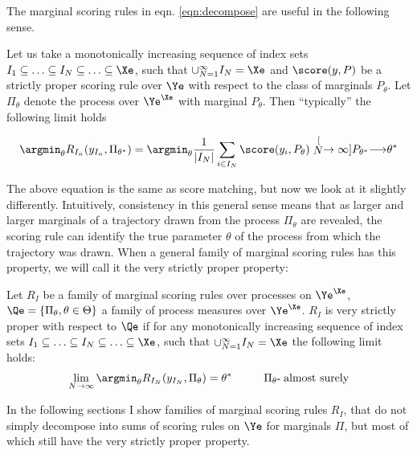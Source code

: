The marginal scoring rules in eqn. \eqref{eqn:decompose} are useful in the following sense.

\begin{statement}
Let us take a monotonically increasing sequence of index sets $I_1\subseteq\ldots\subseteq I_N \subseteq \ldots \subseteq \Xe$, such that $\cup_{N=1}^{\infty} I_N = \Xe$ and $\score(y,P)$ be a strictly proper scoring rule over $\Ye$ with respect to the class of marginals $P_{\theta}$. Let $\Pi_{\theta}$ denote the \iid process over $\Ye^{\Xe}$ with marginal $P_{\theta}$. Then ``typically'' the following limit holds

\begin{align}
\argmin_{\theta}R_{I_n}(y_{I_n},\Pi_{\theta^{*}}) =  \argmin_{\theta} \frac{1}{\vert I_N \vert} \sum_{i\in I_N} \score(y_i,P_{\theta}) \stackrel[N\rightarrow\infty]{P_{\theta^{*}}}{\longrightarrow} \theta^{*}
\end{align}
\end{statement}

The above equation is the same as score matching, but now we look at it slightly differently. Intuitively, consistency in this general sense means that as larger and larger marginals of a trajectory drawn from the process $\Pi_{\theta}$ are revealed, the scoring rule can identify the true parameter $\theta$ of the process from which the trajectory was drawn. When a general family of marginal scoring rules has this property, we will call it the very strictly proper property:

\begin{definition}\label{thm:very_strictly_proper}
Let $R_{I}$ be a family of marginal scoring rules over processes on $\Ye^{\Xe}$, $\Qe = \{\Pi_\theta, \theta\in\Theta\}$ a family of process measures over $\Ye^{\Xe}$. $R_{I}$ is very strictly proper with respect to $\Qe$ if for any monotonically increasing sequence of index sets $I_1\subseteq\ldots\subseteq I_N \subseteq \ldots \subseteq \Xe$, such that $\cup_{N=1}^{\infty} I_N = \Xe$ the following limit holds:
\begin{align}
\lim_{N\rightarrow\infty} \argmin_{\theta} R_{I_N}(y_{I_N},\Pi_{\theta}) = \theta^{*}\hspace{1cm}\Pi_{\theta^{*}}\mbox{\,almost surely}
\end{align}
\end{definition}

In the following sections I show families of marginal scoring rules $R_I$, that do not simply decompose into sums of scoring rules on $\Ye$ for marginals $\Pi$, but most of which still have the very strictly proper property.

